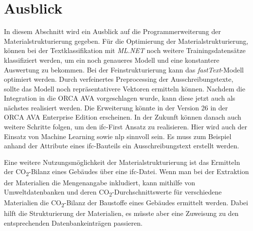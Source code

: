\section{Ausblick}
\label{c:closing:outlook}
In diesem Abschnitt wird ein Ausblick auf die Programmerweiterung der Materialstrukturierung gegeben. Für die Optimierung der Materialstrukturierung, können bei der Textklassifikation mit \textit{ML.NET} noch weitere Trainingsdatensätze klassifiziert werden, um ein noch genaueres Modell und eine konstantere Auswertung zu bekommen. Bei der Feinstrukturierung kann das \textit{fastText}-Modell optimiert werden. Durch verfeinertes Preprocessing der Ausschreibungstexte, sollte das Modell noch repräsentativere Vektoren ermitteln können. Nachdem die Integration in die ORCA AVA vorgeschlagen wurde, kann diese jetzt auch als nächstes realisiert werden. Die Erweiterung könnte in der Version 26 in der ORCA AVA Enterprise Edition erscheinen. In der Zukunft können danach auch weitere Schritte folgen, um den \ac{ifc}-First Ansatz zu realisieren. Hier wird auch der Einsatz von Machine Learning sowie \ac{nlp} sinnvoll sein. Es muss zum Beispiel anhand der Attribute eines \ac{ifc}-Bauteils ein Ausschreibungstext erstellt werden.

Eine weitere Nutzungsmöglichkeit der Materialstrukturierung ist das Ermitteln der CO\textsubscript{2}-Bilanz eines Gebäudes über eine \ac{ifc}-Datei. Wenn man bei der Extraktion der Materialien die Mengenangabe inkludiert, kann mithilfe von Umweltdatenbanken und deren CO\textsubscript{2}-Durchschnittswerte für verschiedene Materialien die CO\textsubscript{2}-Bilanz der Baustoffe eines Gebäudes ermittelt werden. Dabei hilft die Strukturierung der Materialien, es müsste aber eine Zuweisung zu den entsprechenden Datenbankeinträgen passieren. 
